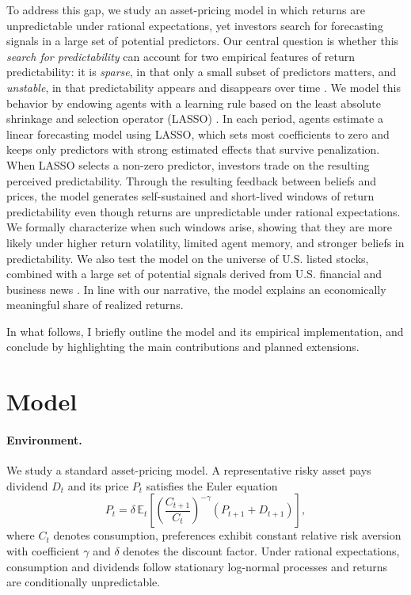 \documentclass[11pt]{article}
\begin{document}
To address this gap, we study an asset-pricing model in which returns are unpredictable under rational expectations, yet investors search for forecasting signals in a large set of potential predictors.
Our central question is whether this \emph{search for predictability} can account for two empirical features of return predictability: it is \emph{sparse}, in that only a small subset of predictors matters, and \emph{unstable}, in that predictability appears and disappears over time \citep{Chinco2019,Farmer2023}.
We model this behavior by endowing agents with a learning rule based on the least absolute shrinkage and selection operator (LASSO) \citep{Tibshirani1996}. 
In each period, agents estimate a linear forecasting model using LASSO, which sets most coefficients to zero and keeps only predictors with strong estimated effects that survive penalization. 
When LASSO selects a non-zero predictor, investors trade on the resulting perceived predictability.
Through the resulting feedback between beliefs and prices, the model generates self-sustained and short-lived windows of return predictability even though returns are unpredictable under rational expectations. 
We formally characterize when such windows arise, showing that they are more likely under higher return volatility, limited agent memory, and stronger beliefs in predictability.
We also test the model on the universe of U.S. listed stocks, combined with a large set of potential signals derived from U.S. financial and business news \citep{bybee2024business}. 
In line with our narrative, the model explains an economically meaningful share of realized returns.

In what follows, I briefly outline the model and its empirical implementation, and conclude by highlighting the main contributions and planned extensions.

\section*{Model}

\paragraph{Environment.}
We study a standard \cite{Lucas1978} asset-pricing model.
A representative risky asset pays dividend $D_t$ and its price $P_t$ satisfies the Euler equation
\begin{equation}\label{eq:euler}
P_t = \delta\,\mathbb{E}_t\!\left[\left(\frac{C_{t+1}}{C_t}\right)^{-\gamma}(P_{t+1}+D_{t+1})\right],
\end{equation}
where $C_t$ denotes consumption, preferences exhibit constant relative risk aversion with coefficient $\gamma$ and $\delta$ denotes the discount factor.
Under rational expectations, consumption and dividends follow stationary log-normal processes and returns are conditionally unpredictable.
\end{document}
